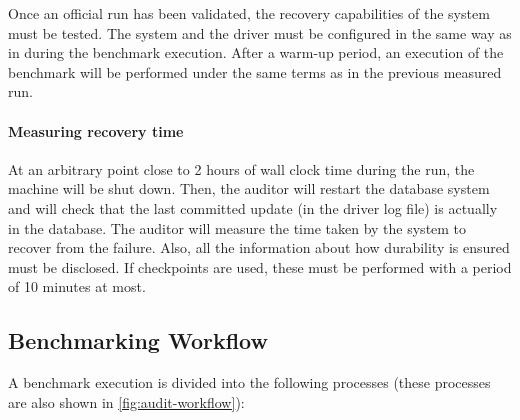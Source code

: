 Once an official run has been validated, the recovery capabilities of the system must be tested. The system and the driver must be configured in the same way as in during the benchmark execution. After a warm-up period, an execution of the benchmark will be performed under the same terms as in the previous measured run.

\paragraph{Measuring recovery time}
At an arbitrary point close to 2 hours of wall clock time during the run, the machine will be shut down. Then, the auditor will restart the database system and will check that the last committed update (in the driver log file) is actually in the database. The auditor will measure the time taken by the system to recover from the failure. Also, all the information about how durability is ensured must be disclosed. If checkpoints are used, these must be performed with a period of 10 minutes at most.


\subsection{Benchmarking Workflow}
\label{sec:benchmark-workflow}

A benchmark execution is divided into the following processes (these processes are also shown in \autoref{fig:audit-workflow}):

